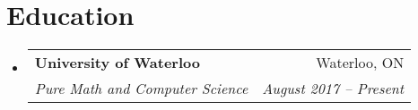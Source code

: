 \documentclass[letterpaper,11pt]{article}
\makeatletter
\newcommand{\resumeSubheading}[4]{
  \vspace{-1pt}\item
    \begin{tabular*}{0.97\textwidth}{l@{\extracolsep{\fill}}r}
      \textbf{#1} & #2 \\
      \textit{\small#3} & \textit{\small #4} \\
    \end{tabular*}\vspace{-5pt}
}
\newcommand{\resumeSubHeadingListStart}{\begin{itemize}[leftmargin=*, label={}]}
\newcommand{\resumeSubHeadingListEnd}{\end{itemize}}
\makeatother
\begin{document}


\section{Education}
  \resumeSubHeadingListStart
    \resumeSubheading
      {University of Waterloo}{Waterloo, ON}
      {Pure Math and Computer Science}{August 2017 -- Present}
  \resumeSubHeadingListEnd
\end{document}
